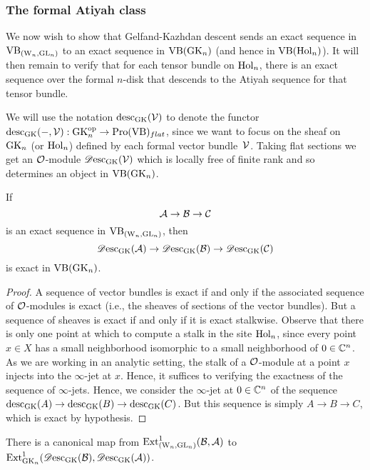 \subsubsection{The formal Atiyah class}

We now wish to show that Gelfand-Kazhdan descent sends an exact sequence in ${\rm VB}_{({{\rm W}_n}, {\rm GL}_n)}$ to an exact sequence in ${\rm VB}({\rm GK}_n)$ (and hence in ${\rm VB}({\rm Hol}_n)$). 
It will then remain to verify that for each tensor bundle on ${\rm Hol}_n$, 
there is an exact sequence over the formal $n$-disk that descends to the Atiyah sequence for that tensor bundle.

We will use the notation ${\rm desc}_{\rm GK}(\mathcal{V})$ to denote the functor ${\rm desc}_{\rm GK}(-,\mathcal{V}): {\rm GK}_n^{{\rm op}} \to {\rm Pro}({\rm VB})_{flat}$, 
since we want to focus on the sheaf on ${\rm GK}_n$ (or ${\rm Hol}_n$) defined
by each formal vector bundle~$\mathcal{V}$. Taking flat sections we get an
$\mathcal O$-module $\mathscr{D}{\rm esc}_{{\rm GK}}(\mathcal{V})$ which is locally free of finite
rank and so determines an object in ${\rm VB}({\rm GK}_n)$. 

\begin{lemma}
If $$\mathcal{A} \to \mathcal B \to \mathcal C$$ is an exact sequence in ${\rm VB}_{({{\rm W}_n}, {\rm GL}_n)}$, then 
$$\mathscr{D}{\rm esc}_{\rm GK}(\mathcal{A}) \to \mathscr{D}{\rm esc}_{\rm GK}(\mathcal B) \to \mathscr{D}{\rm esc}_{\rm GK}(\mathcal C)$$ 
is exact in ${\rm VB}({\rm GK}_n)$.
\end{lemma}

\begin{proof}
A sequence of vector bundles is exact if and only if the associated
sequence of $\mathcal O$-modules is exact (i.e., the sheaves of sections of
the vector bundles). But a sequence of sheaves is exact if and only if
it is exact stalkwise. Observe that there is only one point at which
to compute a stalk in the site ${\rm Hol}_n$, since every point $x \in X$
has a small neighborhood isomorphic to a small neighborhood of $0 \in
\mathbb C^n$. As we are working in an analytic setting, the stalk of a
$\mathcal O$-module at a point $x$ injects into the $\infty$-jet at
$x$. Hence, it suffices to verifying the exactness of the sequence of
$\infty$-jets. Hence, we consider the $\infty$-jet at $0 \in \mathbb C^n$ of
the sequence ${\rm desc}_{\rm GK}(A) \to {\rm desc}_{\rm GK}(B) \to {\rm desc}_{\rm GK}(C)$. But
this sequence is simply $A \to B \to C$, which is exact by
hypothesis.
\end{proof}

\begin{cor}
There is a canonical map from ${\rm Ext}^1_{({{\rm W}_n}, {\rm GL}_n)}(\mathcal B,\mathcal{A})$ to ${\rm Ext}^1_{{\rm GK}_n}(\mathscr{D}{\rm esc}_{\rm GK}(\mathcal B), \mathscr{D}{\rm esc}_{\rm GK}(\mathcal{A}))$.
\end{cor}

